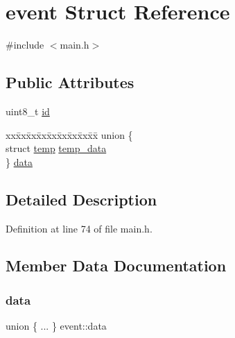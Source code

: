 \hypertarget{structevent}{}\section{event Struct Reference}
\label{structevent}


{\ttfamily \#include $<$main.\+h$>$}

\subsection*{Public Attributes}
\begin{DoxyCompactItemize}
\item 
uint8\+\_\+t \hyperlink{structevent_a270f4da7959257f345b1c43e6056b53c}{id}
\item 
\begin{tabbing}
xx\=xx\=xx\=xx\=xx\=xx\=xx\=xx\=xx\=\kill
union \{\\
\>struct \hyperlink{structtemp}{temp} \hyperlink{structevent_a1091ebe2b1484f3e99aedb48a4b01514}{temp\_data}\\
\} \hyperlink{structevent_a78bc19a07391070a001cd32b7ede572f}{data}\\

\end{tabbing}\end{DoxyCompactItemize}


\subsection{Detailed Description}


Definition at line 74 of file main.\+h.



\subsection{Member Data Documentation}
\mbox{\label{structevent_a78bc19a07391070a001cd32b7ede572f}} 
\subsubsection{\texorpdfstring{data}{data}}
{\footnotesize\ttfamily union \{ ... \}  event\+::data}

\mbox{\label{structevent_a270f4da7959257f345b1c43e6056b53c}} 
